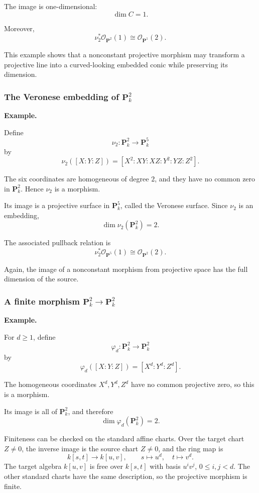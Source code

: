 The image is one-dimensional:
\[
\dim C=1.
\]

Moreover,
\[
\nu_2^*\mathcal O_{\mathbf P^2}(1)
\cong
\mathcal O_{\mathbf P^1}(2).
\]

This example shows that a nonconstant projective morphism may transform a projective line into a curved-looking embedded conic while preserving its dimension.

\subsubsection{The Veronese embedding of \(\mathbf P^2_k\)}

\textbf{Example.}

Define
\[
\nu_2:\mathbf P^2_k\longrightarrow\mathbf P^5_k
\]
by
\[
\nu_2([X:Y:Z])
=
[X^2:XY:XZ:Y^2:YZ:Z^2].
\]

The six coordinates are homogeneous of degree \(2\), and they have no common zero in \(\mathbf P^2_k\). Hence \(\nu_2\) is a morphism.

Its image is a projective surface in \(\mathbf P^5_k\), called the Veronese surface. Since \(\nu_2\) is an embedding,
\[
\dim\nu_2(\mathbf P^2_k)=2.
\]

The associated pullback relation is
\[
\nu_2^*\mathcal O_{\mathbf P^5}(1)
\cong
\mathcal O_{\mathbf P^2}(2).
\]

Again, the image of a nonconstant morphism from projective space has the full dimension of the source.

\subsubsection{\texorpdfstring{A finite morphism \(\mathbf P^2_k\to\mathbf P^2_k\)}{A finite morphism P2 to P2}}

\textbf{Example.}

For \(d\geq1\), define
\[
\varphi_d:\mathbf P^2_k\longrightarrow\mathbf P^2_k
\]
by
\[
\varphi_d([X:Y:Z])
=
[X^d:Y^d:Z^d].
\]

The homogeneous coordinates \(X^d,Y^d,Z^d\) have no common projective zero, so this is a morphism.

Its image is all of \(\mathbf P^2_k\), and therefore
\[
\dim\varphi_d(\mathbf P^2_k)=2.
\]

Finiteness can be checked on the standard affine charts. Over the
target chart \(Z\neq0\), the inverse image is the source chart
\(Z\neq0\), and the ring map is
\[
k[s,t]\longrightarrow k[u,v],\qquad s\longmapsto u^d,\quad
t\longmapsto v^d.
\]
The target algebra \(k[u,v]\) is free over \(k[s,t]\) with basis
\(u^iv^j\), \(0\leq i,j<d\). The other standard charts have the
same description, so the projective morphism is finite.

